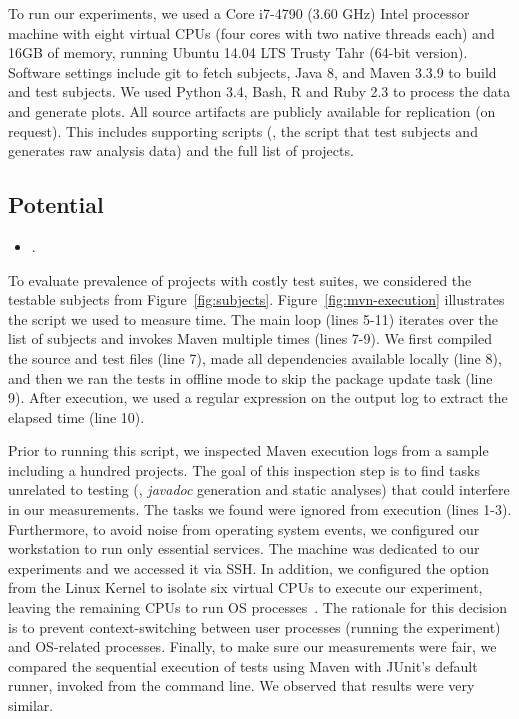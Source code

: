 To run our experiments, we used a Core i7-4790 (3.60 GHz) Intel
processor machine with eight virtual CPUs (four cores with two native
threads each) and 16GB of memory, running Ubuntu 14.04 LTS Trusty Tahr
(64-bit version).  Software settings include git to fetch
subjects, Java 8, and Maven 3.3.9 to build and test subjects. We used
Python 3.4, Bash, R and Ruby 2.3 to process the data and generate plots.  All
source artifacts are publicly available for replication (on
request).  This includes supporting
scripts (\eg, the script that test subjects and generates raw analysis
data) and the full list of projects. 

\subsection{Potential}
\label{sec:rqA}
\label{sec:rqB}

\begin{itemize}
    \item \numRQA{}. \textbf{\RQA}
\end{itemize}

To evaluate prevalence of projects with costly test suites, we
considered the \numSubjs{} testable subjects from
Figure~\ref{fig:subjects}.  Figure~\ref{fig:mvn-execution} illustrates
the script we used to measure time.  The main loop (lines 5-11)
iterates over the list of subjects and invokes Maven multiple
times (lines 7-9).  We
first compiled the source and test files (line 7), made all
dependencies available locally (line 8), and then we ran the tests in
offline mode to skip the package update task (line 9). After
execution, we used a regular expression on the output log to extract
the elapsed time (line 10).

Prior to running this script, we inspected Maven execution logs from a
sample including a hundred projects.  The goal of this inspection step
is to find tasks unrelated to testing (\eg, \emph{javadoc} generation
and static analyses) that could interfere in our measurements.  The
tasks we found were ignored from execution (lines 1-3).  Furthermore,
to avoid noise from operating system events, we configured our
workstation to run only essential services.  The machine was dedicated
to our experiments and we accessed it via SSH. In addition, we
configured the  option from the Linux Kernel
\cite{linux-kernel} to isolate six virtual CPUs to execute our
experiment, leaving the remaining CPUs to run OS
processes~\cite{isolcpus-use}.  The rationale for this decision is to
prevent context-switching between user processes (running the
experiment) and OS-related processes.  Finally, to make sure our
measurements were fair, we compared the sequential execution of tests
using Maven with JUnit's default  runner, invoked
from the command line.  We observed that results were very similar.

